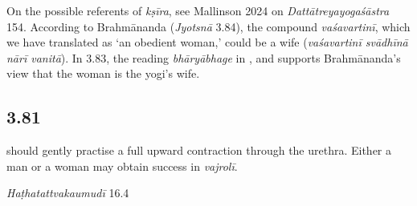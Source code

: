 \begin{ekdosis}
\begin{testimonia}[hp03_080]
\end{testimonia}

\begin{philcomm}[hp03_080]
On the possible referents of \emph{kṣīra}, see Mallinson 2024 on \emph{Dattātreyayogaśāstra} 154. According to Brahmānanda (\emph{Jyotsnā} 3.84), the compound \emph{vaśavartinī}, which we have translated as `an obedient woman,' could be a wife (\emph{vaśavartinī svādhīnā nārī vanitā}). In 3.83, the reading \emph{bhāryābhage} in ,  and  supports Brahmānanda's view that the woman is the yogi's wife. 
\end{philcomm}


\subsection*{3.81}
\begin{translation} should gently practise a full upward contraction through the urethra. Either a man or a woman may obtain success in \emph{vajrolī}.
\end{translation}


\begin{testimonia}[hp03_081]
\emph{Haṭhatattvakaumudī} 16.4
\begin{versinnote}
\end{versinnote}


\end{testimonia}
\end{ekdosis}
